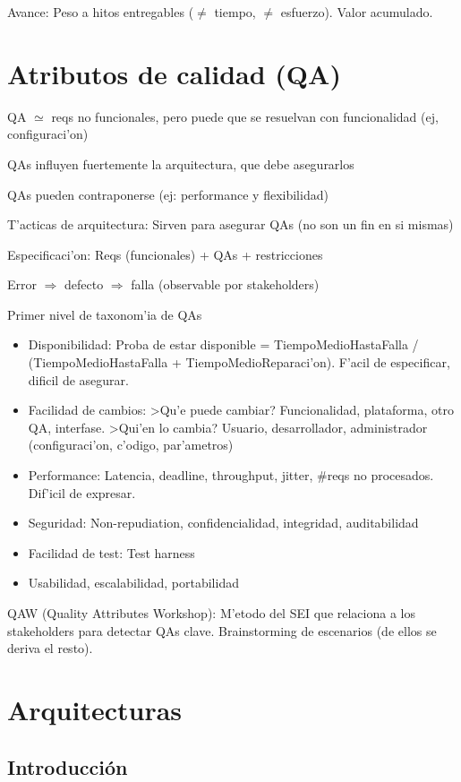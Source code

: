 \documentclass[a4paper,spanish]{article}
\begin{document}
Avance: Peso a hitos entregables ($\neq$ tiempo, $\neq$ esfuerzo). 
	Valor acumulado.
	
\section{Atributos de calidad (QA)}

QA $\simeq$ reqs no funcionales, pero puede que se resuelvan con funcionalidad
 (ej, configuraci'on)

QAs influyen fuertemente la arquitectura, que debe asegurarlos

QAs pueden contraponerse (ej: performance y flexibilidad)

T'acticas de arquitectura: Sirven para asegurar QAs (no son un fin en si 
	mismas)

Especificaci'on: Reqs (funcionales) + QAs + restricciones

Error $\Rightarrow$ defecto $\Rightarrow$ falla (observable por stakeholders)

Primer nivel de taxonom'ia de QAs
\begin{itemize}
\item Disponibilidad: Proba de estar disponible = TiempoMedioHastaFalla /
   (TiempoMedioHastaFalla + TiempoMedioReparaci'on). F'acil de especificar,
   dificil de asegurar.
\item Facilidad de cambios: >Qu'e puede cambiar? Funcionalidad, plataforma,
	otro QA, interfase. >Qui'en lo cambia? Usuario, desarrollador, 
	administrador (configuraci'on, c'odigo, par'ametros)
\item Performance: Latencia, deadline, throughput, jitter, \#reqs no 
	procesados. Dif'icil de expresar.
\item Seguridad: Non-repudiation, confidencialidad, integridad, auditabilidad
\item Facilidad de test: Test harness
\item Usabilidad, escalabilidad, portabilidad
\end{itemize}

QAW (Quality Attributes Workshop): M'etodo del SEI que relaciona a los 
	stakeholders para detectar QAs clave. Brainstorming de escenarios (de 
	ellos se deriva el resto).

\section{Arquitecturas}

\subsection{Introducci\'on}
\end{document}
